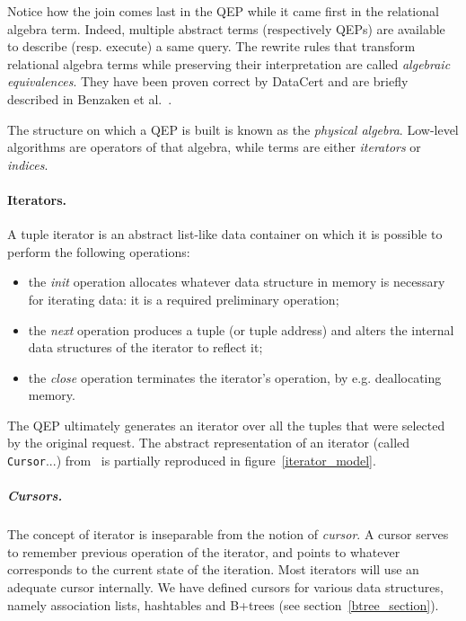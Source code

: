 \documentclass[11pt]{article}
\def\coqe{\lstinline[language=Coq, basicstyle=\small]}
\begin{document}
Notice how the join comes last in the QEP while it came first in the relational algebra term.
Indeed, multiple abstract terms (respectively QEPs) are available to describe (resp. execute) a same query.
The rewrite rules that transform relational algebra terms while preserving their interpretation are called \emph{algebraic equivalences}.
They have been proven correct by DataCert and are briefly described in Benzaken et al.~\cite{CFRDM}.

The structure on which a QEP is built is known as the \emph{physical algebra}.
Low-level algorithms are operators of that algebra, while terms are either \emph{iterators} or \emph{indices}.

\paragraph{Iterators.}

A tuple iterator is an abstract list-like data container on which it is possible to perform the following operations:
\begin{itemize}[topsep=0pt, noitemsep]
\item the \emph{init} operation allocates whatever data structure in memory is necessary for iterating data: it is a required preliminary operation;
\item the \emph{next} operation produces a tuple (or tuple address) and alters the internal data structures of the iterator to reflect it;
\item the \emph{close} operation terminates the iterator's operation, by e.g. deallocating memory.
\end{itemize}

The QEP ultimately generates an iterator over all the tuples that were selected by the original request.
The abstract representation of an iterator (called \coqe{Cursor}...) from~\cite{CFSEE} is partially reproduced in figure~\ref{iterator_model}.

\subparagraph{Cursors.} The concept of iterator is inseparable from the notion of \emph{cursor}. A cursor serves to remember previous operation of the iterator, and points to whatever corresponds to the current state of the iteration. Most iterators will use an adequate cursor internally. We have defined cursors for various data structures, namely association lists, hashtables and B+trees (see section~\ref{btree_section}).
\end{document}

